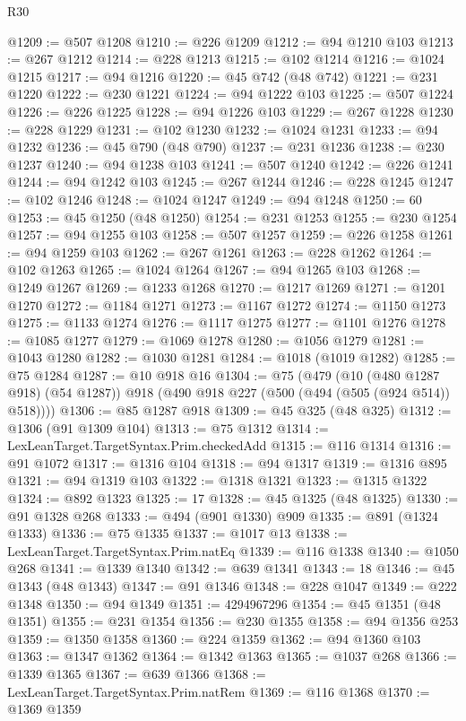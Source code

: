\begin{lexlean}{R30}
\begin{coremodule}
@1209 := @507 @1208
@1210 := @226 @1209
@1212 := @94 @1210 @103
@1213 := @267 @1212
@1214 := @228 @1213
@1215 := @102 @1214
@1216 := @1024 @1215
@1217 := @94 @1216
@1220 := @45 @742 (@48 @742)
@1221 := @231 @1220
@1222 := @230 @1221
@1224 := @94 @1222 @103
@1225 := @507 @1224
@1226 := @226 @1225
@1228 := @94 @1226 @103
@1229 := @267 @1228
@1230 := @228 @1229
@1231 := @102 @1230
@1232 := @1024 @1231
@1233 := @94 @1232
@1236 := @45 @790 (@48 @790)
@1237 := @231 @1236
@1238 := @230 @1237
@1240 := @94 @1238 @103
@1241 := @507 @1240
@1242 := @226 @1241
@1244 := @94 @1242 @103
@1245 := @267 @1244
@1246 := @228 @1245
@1247 := @102 @1246
@1248 := @1024 @1247
@1249 := @94 @1248
@1250 := 60
@1253 := @45 @1250 (@48 @1250)
@1254 := @231 @1253
@1255 := @230 @1254
@1257 := @94 @1255 @103
@1258 := @507 @1257
@1259 := @226 @1258
@1261 := @94 @1259 @103
@1262 := @267 @1261
@1263 := @228 @1262
@1264 := @102 @1263
@1265 := @1024 @1264
@1267 := @94 @1265 @103
@1268 := @1249 @1267
@1269 := @1233 @1268
@1270 := @1217 @1269
@1271 := @1201 @1270
@1272 := @1184 @1271
@1273 := @1167 @1272
@1274 := @1150 @1273
@1275 := @1133 @1274
@1276 := @1117 @1275
@1277 := @1101 @1276
@1278 := @1085 @1277
@1279 := @1069 @1278
@1280 := @1056 @1279
@1281 := @1043 @1280
@1282 := @1030 @1281
@1284 := @1018 (@1019 @1282)
@1285 := @75 @1284
@1287 := @10 @918 @16
@1304 := @75
    (@479
      (@10 (@480 @1287 @918) (@54 @1287))
      @918
      (@490 @918 @227 (@500 (@494 (@505 (@924 @514)) @518))))
@1306 := @85 @1287 @918
@1309 := @45 @325 (@48 @325)
@1312 := @1306 (@91 @1309 @104)
@1313 := @75 @1312
@1314 := LexLeanTarget.TargetSyntax.Prim.checkedAdd
@1315 := @116 @1314
@1316 := @91 @1072
@1317 := @1316 @104
@1318 := @94 @1317
@1319 := @1316 @895
@1321 := @94 @1319 @103
@1322 := @1318 @1321
@1323 := @1315 @1322
@1324 := @892 @1323
@1325 := 17
@1328 := @45 @1325 (@48 @1325)
@1330 := @91 @1328 @268
@1333 := @494 (@901 @1330) @909
@1335 := @891 (@1324 @1333)
@1336 := @75 @1335
@1337 := @1017 @13
@1338 := LexLeanTarget.TargetSyntax.Prim.natEq
@1339 := @116 @1338
@1340 := @1050 @268
@1341 := @1339 @1340
@1342 := @639 @1341
@1343 := 18
@1346 := @45 @1343 (@48 @1343)
@1347 := @91 @1346
@1348 := @228 @1047
@1349 := @222 @1348
@1350 := @94 @1349
@1351 := 4294967296
@1354 := @45 @1351 (@48 @1351)
@1355 := @231 @1354
@1356 := @230 @1355
@1358 := @94 @1356 @253
@1359 := @1350 @1358
@1360 := @224 @1359
@1362 := @94 @1360 @103
@1363 := @1347 @1362
@1364 := @1342 @1363
@1365 := @1037 @268
@1366 := @1339 @1365
@1367 := @639 @1366
@1368 := LexLeanTarget.TargetSyntax.Prim.natRem
@1369 := @116 @1368
@1370 := @1369 @1359

\end{coremodule}
\end{lexlean}
